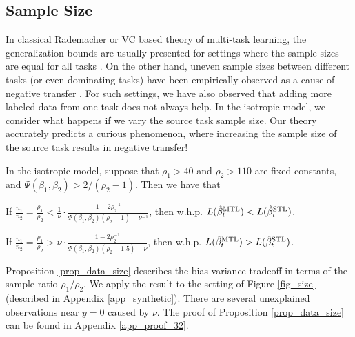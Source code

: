 \subsection{Sample Size}\label{sec_data_size}

In classical Rademacher or VC based theory of multi-task learning, the generalization bounds are usually presented for settings where the sample sizes are equal for all tasks \cite{B00,M06,MPR16}.
On the other hand, uneven sample sizes between different tasks (or even dominating tasks) have been empirically observed as a cause of negative transfer \cite{YKGLHF20}.
For such settings, we have also observed that adding more labeled data from one task does not always help.
In the isotropic model, we consider what happens if we vary the source task sample size.
Our theory accurately predicts a curious phenomenon, where increasing the sample size of the source task results in negative transfer!

\begin{proposition}\label{prop_data_size}
	In the isotropic model, suppose that $\rho_1 > 40$ and $\rho_2 > 110$ are fixed constants, and $\Psi(\beta_1, \beta_2) > 2/(\rho_2 - 1)$.
	Then we have that
	\squishlist
		\item If $\frac{n_1}{n_2} = \frac{\rho_1}{\rho_2} < \frac{1}{\nu} \cdot \frac{1 - 2\rho_2^{-1}}{\Psi(\beta_1, \beta_2) (\rho_2 - 1) - \nu^{-1}}$, then w.h.p. $L(\hat{\beta}_t^{\text{MTL}}) < L(\hat{\beta}_t^{\text{STL}})$.
		\item If $\frac{n_1}{n_2} = \frac{\rho_1}{\rho_2} > {\nu} \cdot \frac{1 - 2\rho_2^{-1}}{\Psi(\beta_1, \beta_2) (\rho_2 - 1.5) - \nu}$, then w.h.p. $L(\hat{\beta}_t^{\text{MTL}}) > L(\hat{\beta}_t^{\text{STL}})$.
	\squishend
\end{proposition}
Proposition \ref{prop_data_size} describes the bias-variance tradeoff in terms of the sample ratio $\rho_1 / \rho_2$.
We apply the result to the setting of Figure \ref{fig_size} (described in Appendix \ref{app_synthetic}).
There are several unexplained observations near $y = 0$ caused by $\nu$.
The proof of Proposition \ref{prop_data_size} can be found in Appendix \ref{app_proof_32}.

